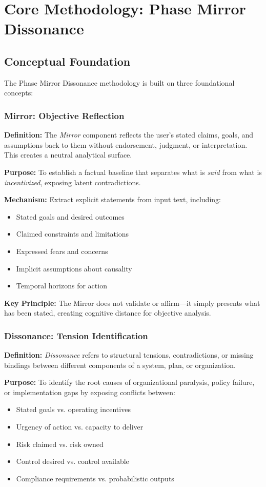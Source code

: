\documentclass[11pt,a4paper]{article}
\begin{document}
\section{Core Methodology: Phase Mirror Dissonance}

\subsection{Conceptual Foundation}

The Phase Mirror Dissonance methodology is built on three foundational concepts:

\subsubsection{Mirror: Objective Reflection}

\textbf{Definition:} The \textit{Mirror} component reflects the user's stated claims, goals, and assumptions back to them without endorsement, judgment, or interpretation. This creates a neutral analytical surface.

\textbf{Purpose:} To establish a factual baseline that separates what is \textit{said} from what is \textit{incentivized}, exposing latent contradictions.

\textbf{Mechanism:} Extract explicit statements from input text, including:
\begin{itemize}
\item Stated goals and desired outcomes
\item Claimed constraints and limitations
\item Expressed fears and concerns
\item Implicit assumptions about causality
\item Temporal horizons for action
\end{itemize}

\textbf{Key Principle:} The Mirror does not validate or affirm—it simply presents what has been stated, creating cognitive distance for objective analysis.

\subsubsection{Dissonance: Tension Identification}

\textbf{Definition:} \textit{Dissonance} refers to structural tensions, contradictions, or missing bindings between different components of a system, plan, or organization.

\textbf{Purpose:} To identify the root causes of organizational paralysis, policy failure, or implementation gaps by exposing conflicts between:
\begin{itemize}
\item Stated goals vs. operating incentives
\item Urgency of action vs. capacity to deliver
\item Risk claimed vs. risk owned
\item Control desired vs. control available
\item Compliance requirements vs. probabilistic outputs
\end{itemize}
\end{document}

